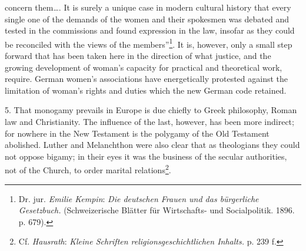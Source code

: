 \documentclass[12pt,a4paper,openany]{book}
\newcommand{\opage}[1]{\marginnote{\footnotesize\textit{[#1]}}}
\begin{document}
concern them\dots{}. It is surely a unique case in modern cultural history that every single one of the demands of the
women and their spokesmen was debated and tested in the commissions and found expression in the law, insofar as they
could be reconciled with the views of the members''\footnote[1]{Dr. jur. \emph{Emilie Kempin}: \textit{Die deutschen
Frauen und das bürgerliche Gesetzbuch.} (Schweizerische Blätter für Wirtschafts- und Socialpolitik. 1896. p. 679).}. It
is, however, only a small step forward that has been taken here in the direction of what justice, and the growing
development of woman's capacity for practical and theoretical work, require. German women's associations have
energetically protested against the limitation
\opage{308}of woman's rights and duties which the new German code retained.

5. That monogamy prevails in Europe is due chiefly to Greek philosophy, Roman law and Christianity. The influence of the
last, however, has been more indirect; for nowhere in the New Testament is the polygamy of the Old Testament abolished.
Luther and Melanchthon were also clear that as theologians they could not oppose bigamy; in their eyes it was the
business of the secular authorities, not of the Church, to order marital relations\footnote[1]{Cf. \emph{Hausrath}:
\textit{Kleine Schriften religionsgeschichtlichen Inhalts.} p. 239 f.}.
\end{document}
